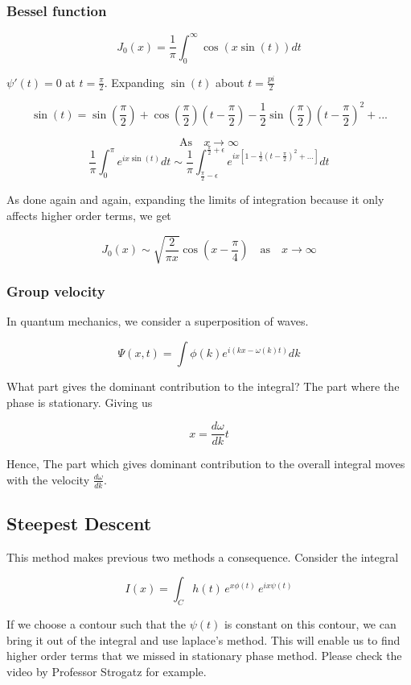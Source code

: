 \documentclass{report}
\begin{document}
\subsubsection{Bessel function}

$$J_0(x) = \frac{1}{\pi}\int_{0}^{\infty}\cos(x\sin(t)) dt$$

\noindent $\psi'(t) = 0$ at $t=\frac{\pi}{2}$. Expanding $\sin(t)$ about $t=\frac{pi}{2}$

$$\sin\left(t\right) = \sin\left(\frac{\pi}{2}\right) + \cos\left(\frac{\pi}{2}\right)\left(t-\frac{\pi}{2}\right) -\frac{1}{2}\sin\left(\frac{\pi}{2}\right)\left(t-\frac{\pi}{2}\right)^2 + ...$$

$$\mathrm{As}\quad x\to\infty$$ 
$$\frac{1}{\pi}\int_{0}^{\pi}e^{ix\sin(t)}dt\sim \frac{1}{\pi}\int_{\frac{\pi}{2}-\epsilon}^{\frac{\pi}{2}+\epsilon}e^{ix\left[1-\frac{1}{2}\left(t-\frac{\pi}{2}\right)^2 +...\right]}dt$$

\noindent As done again and again, expanding the limits of integration because it only affects higher order terms, we get 

$$J_0\left(x\right) \sim \sqrt{\frac{2}{\pi x}} \cos\left(x-\frac{\pi}{4}\right) \quad\mathrm{as}\quad x\to\infty$$

\subsubsection{Group velocity}

In quantum mechanics, we consider a superposition of waves.

$$\Psi(x,t) = \int{\phi(k)e^{i(kx-\omega(k)t)}}dk$$

\noindent What part gives the dominant contribution to the integral? The part where the phase is stationary. Giving us

$$x = \frac{d\omega}{dk} t$$

\noindent Hence, The part which gives dominant contribution to the overall integral moves with the velocity $\frac{d\omega}{dk}$.

\subsection{Steepest Descent}
This method makes previous two methods a consequence. Consider the integral 

$$I(x) = \int_{C}h(t)\, e^{x\phi(t)}\, e^{ix\psi(t)}$$

\noindent If we choose a contour such that the $\psi(t)$ is constant on this contour, we can bring it out of the integral and use laplace's method. This will enable us to find higher order terms that we missed in stationary phase method. Please check the video by Professor Strogatz for example.\\
\end{document}
